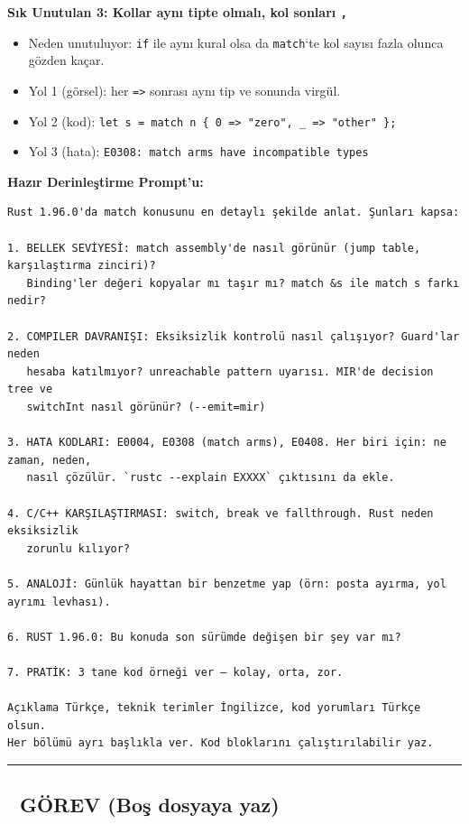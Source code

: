 \documentclass[12pt,a4paper]{article}
\begin{document}
\textbf{Sık Unutulan 3: Kollar aynı tipte olmalı, kol sonları \texttt{,}}

\begin{itemize}
\tightlist
\item
  Neden unutuluyor: \texttt{if} ile aynı kural olsa da \texttt{match}`te kol sayısı fazla olunca gözden kaçar.
\item
  Yol 1 (görsel): her \texttt{=\textgreater{}} sonrası aynı tip ve sonunda virgül.
\item
  Yol 2 (kod): \texttt{let\ s\ =\ match\ n\ \{\ 0\ =\textgreater{}\ "zero",\ \_\ =\textgreater{}\ "other"\ \};}
\item
  Yol 3 (hata): \texttt{E0308:\ match\ arms\ have\ incompatible\ types}
\end{itemize}

\textbf{Hazır Derinleştirme Prompt'u:}

\begin{verbatim}
Rust 1.96.0'da match konusunu en detaylı şekilde anlat. Şunları kapsa:

1. BELLEK SEVİYESİ: match assembly'de nasıl görünür (jump table, karşılaştırma zinciri)?
   Binding'ler değeri kopyalar mı taşır mı? match &s ile match s farkı nedir?

2. COMPILER DAVRANIŞI: Eksiksizlik kontrolü nasıl çalışıyor? Guard'lar neden
   hesaba katılmıyor? unreachable pattern uyarısı. MIR'de decision tree ve
   switchInt nasıl görünür? (--emit=mir)

3. HATA KODLARI: E0004, E0308 (match arms), E0408. Her biri için: ne zaman, neden,
   nasıl çözülür. `rustc --explain EXXXX` çıktısını da ekle.

4. C/C++ KARŞILAŞTIRMASI: switch, break ve fallthrough. Rust neden eksiksizlik
   zorunlu kılıyor?

5. ANALOJİ: Günlük hayattan bir benzetme yap (örn: posta ayırma, yol ayrımı levhası).

6. RUST 1.96.0: Bu konuda son sürümde değişen bir şey var mı?

7. PRATİK: 3 tane kod örneği ver — kolay, orta, zor.

Açıklama Türkçe, teknik terimler İngilizce, kod yorumları Türkçe olsun.
Her bölümü ayrı başlıkla ver. Kod bloklarını çalıştırılabilir yaz.
\end{verbatim}

\begin{center}\rule{0.5\linewidth}{0.5pt}\end{center}

\subsection{📝 GÖREV (Boş dosyaya yaz)}\label{görev-boş-dosyaya-yaz-6}
\end{document}
